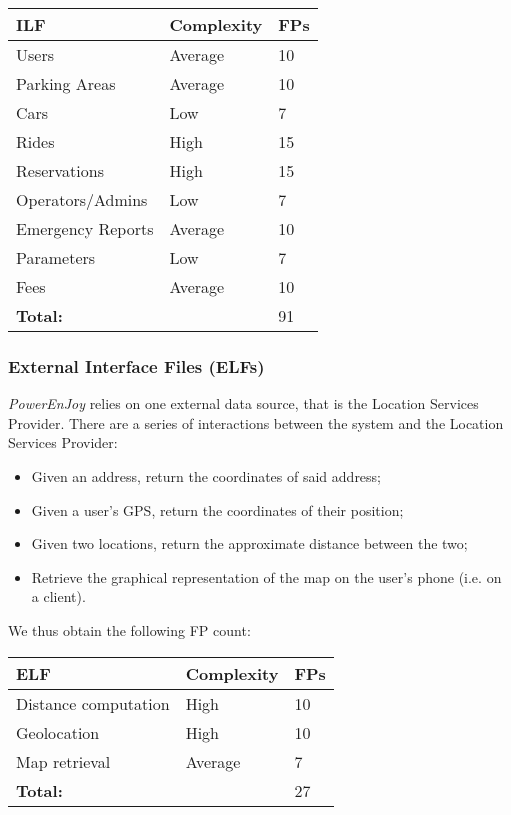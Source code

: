 	\begin{tabular}{|l|l|l|}
		\hline
		\textbf{ILF} & \textbf{Complexity} & \textbf{FPs}\\ \hline
		Users & Average & 10\\ \hline
		Parking Areas & Average & 10\\ \hline
		Cars & Low & 7\\ \hline
		Rides & High & 15\\ \hline
		Reservations & High & 15\\ \hline
		Operators/Admins & Low & 7\\ \hline
		Emergency Reports & Average & 10\\ \hline
		Parameters & Low & 7\\ \hline
		Fees & Average & 10\\ \hline
		\multicolumn{2}{|l|}{\textbf{Total:}}& 91 \\ \hline
	\end{tabular}


\subsubsection{External Interface Files (ELFs)}
\textit{PowerEnJoy} relies on one external data source, that is the Location Services Provider. 
There are a series of interactions between the system and the Location Services Provider:

	\begin{itemize}
		\item Given an address, return the coordinates of said address;
		\item Given a user's GPS, return the coordinates of their position;
		\item Given two locations, return the approximate distance between the two;
		\item Retrieve the graphical representation of the map on the user's phone (i.e. on a client).
	\end{itemize}

We thus obtain the following FP count: \\

	\begin{tabular}{|l|l|l|}
		\hline
		\textbf{ELF} & \textbf{Complexity} & \textbf{FPs}\\ \hline
		Distance computation & High & 10 \\ \hline
		Geolocation & High & 10\\ \hline
		Map retrieval & Average & 7\\ \hline
		\multicolumn{2}{|l|}{\textbf{Total:}}& 27 \\ \hline
	\end{tabular}


